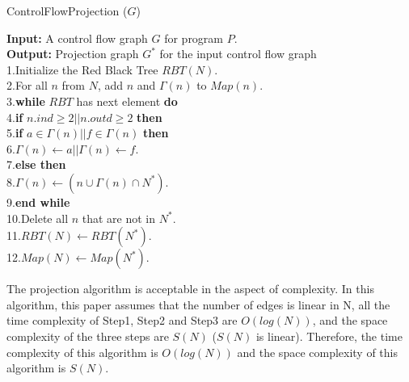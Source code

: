 \begin{algorithm}
\caption{ControlFlowProjection ($G$)}\label{alg:A1}
\textbf{Input:} A control flow graph $G$ for program $P$.\\
\textbf{Output:} Projection graph $G^*$ for the input control flow graph\\
1.\quad	Initialize the Red Black Tree $\mathit{RBT}(N)$.\\
2.\quad	For all $n$ from $N$, add $n$ and $\Gamma(n)$ to $\mathit{Map}(n)$.\\
3.\quad	\textbf{while} $\mathit{RBT}$ has next element \textbf{do}\\
4.\quad	\quad \textbf{if} $n.ind\geq 2 || n.outd\geq 2$ \textbf{then}\\
5.\quad \quad \quad    \textbf{if} $a\in \Gamma(n) || f\in \Gamma(n)$ \textbf{then}\\
6.\quad \quad \quad \quad	   $\Gamma(n)\leftarrow a || \Gamma(n)\leftarrow f$.\\
7.\quad \quad \textbf{else then} \\
8.\quad \quad \quad  $\Gamma(n)\leftarrow (n\cup \Gamma(n)\cap N^*)$.\\
9.\quad\textbf{end while}\\
10.\quad	Delete all $n$ that are not in $N^*$.\\
11.\quad	$\mathit{RBT(N)} \leftarrow \mathit{RBT}(N^*)$.\\
12.\quad	$\mathit{Map}(N) \leftarrow \mathit{Map}(N^*)$.\\
\end{algorithm}

The projection algorithm is acceptable in the aspect of complexity. In this algorithm, this paper assumes that the number of edges is linear in N, all the time complexity of Step1, Step2 and Step3 are $O(log(N))$, and the space complexity of the three steps are $S(N)$ ($S(N)$ is linear). Therefore, the time complexity of this algorithm is $O(log(N))$ and the space complexity of this algorithm is $S(N)$.

